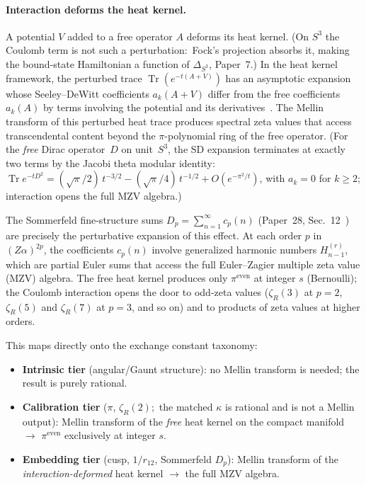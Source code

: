 \documentclass[aps,pra,twocolumn,superscriptaddress,longbibliography]{revtex4-2}
\begin{document}
\paragraph{Interaction deforms the heat kernel.}
A potential $V$ added to a free operator $A$ deforms its heat kernel.
(On $S^3$ the Coulomb term is not such a perturbation:\ Fock's
projection absorbs it, making the bound-state Hamiltonian a function of
$\Delta_{S^3}$, Paper~7.)  In the heat kernel framework, the perturbed trace
$\operatorname{Tr}(e^{-t(A + V)})$ has an asymptotic expansion whose
Seeley--DeWitt coefficients $a_k(A + V)$ differ from the free
coefficients $a_k(A)$ by terms involving the potential and its
derivatives~\cite{gilkey1975}.  The Mellin transform of this perturbed
heat trace produces spectral zeta values that access transcendental
content beyond the $\pi$-polynomial ring of the free operator.
(For the \emph{free} Dirac operator~$D$ on unit~$S^3$, the SD
expansion terminates at exactly two terms by the Jacobi theta modular
identity: $\operatorname{Tr} e^{-tD^2}
= (\sqrt{\pi}/2)\,t^{-3/2} - (\sqrt{\pi}/4)\,t^{-1/2}
+ O(e^{-\pi^2/t})$, with $a_k = 0$ for $k \geq 2$; interaction opens
the full MZV algebra.)

The Sommerfeld fine-structure sums $D_p = \sum_{n=1}^\infty c_p(n)$
(Paper~28, Sec.~12~\cite{loutey_paper28}) are precisely the
perturbative expansion of this effect.  At each order $p$ in
$(Z\alpha)^{2p}$, the coefficients $c_p(n)$ involve generalized
harmonic numbers $H_{n-1}^{(r)}$, which are partial Euler sums that
access the full Euler--Zagier multiple zeta value (MZV) algebra.  The
free heat kernel produces only $\pi^{\text{even}}$ at integer $s$ (Bernoulli); the
Coulomb interaction opens the door to odd-zeta values ($\zeta_R(3)$
at $p = 2$, $\zeta_R(5)$ and $\zeta_R(7)$ at $p = 3$, and so on)
and to products of zeta values at higher orders.

This maps directly onto the exchange constant taxonomy:
\begin{itemize}
  \item \textbf{Intrinsic tier} (angular/Gaunt structure): no Mellin
    transform is needed; the result is purely rational.
  \item \textbf{Calibration tier} ($\pi$, $\zeta_R(2)$;\ the matched
    $\kappa$ is rational and is not a Mellin output):
    Mellin transform of the \emph{free} heat kernel on the compact
    manifold $\to$ $\pi^{\text{even}}$ exclusively at integer $s$.
  \item \textbf{Embedding tier} (cusp, $1/r_{12}$, Sommerfeld $D_p$):
    Mellin transform of the \emph{interaction-deformed} heat kernel
    $\to$ the full MZV algebra.
\end{itemize}
\end{document}
